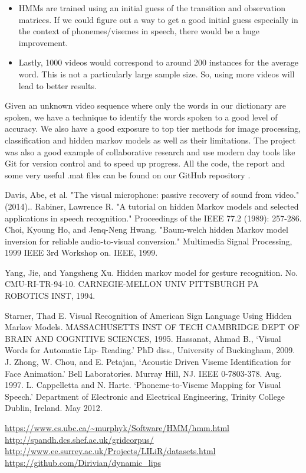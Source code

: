 \documentclass[a4paper]{article}
\begin{document}
\begin{itemize}
	\item HMMs are trained using an initial guess of the transition and observation matrices. If we could figure out a way to get a good initial guess especially in the context of phonemes/visemes in speech, there would be a huge improvement.
	
	\item Lastly, 1000 videos would correspond to around 200 instances for the average word. This is not a particularly large sample size. So, using more videos will lead to better results.		
\end{itemize}


Given an unknown video sequence where only the words in our dictionary are spoken, we have a technique to identify the words spoken to a good level of accuracy. We also have a good exposure to top tier methods for image processing, classification and hidden markov models as well as their limitations. The project was also a good example of collaborative research and use modern day tools like Git for version control and to speed up progress. All the code, the report and some very useful .mat files can be found on our GitHub repository \cite{key-12}.

\newpage
\begin{thebibliography}{1}
	Davis, Abe, et al. "The visual microphone: passive recovery of sound from video." (2014)..
	Rabiner, Lawrence R. "A tutorial on hidden Markov models and selected applications in speech recognition." Proceedings of the IEEE 77.2 (1989): 257-286.	
	Choi, Kyoung Ho, and Jenq-Neng Hwang. "Baum-welch hidden Markov model inversion for reliable audio-to-visual conversion." Multimedia Signal Processing, 1999 IEEE 3rd Workshop on. IEEE, 1999.
	
	Yang, Jie, and Yangsheng Xu. Hidden markov model for gesture recognition. No. CMU-RI-TR-94-10. CARNEGIE-MELLON UNIV PITTSBURGH PA ROBOTICS INST, 1994.

	Starner, Thad E. Visual Recognition of American Sign Language Using Hidden Markov Models. MASSACHUSETTS INST OF TECH CAMBRIDGE DEPT OF BRAIN AND COGNITIVE SCIENCES, 1995.
	Hassanat, Ahmad B., `Visual Words for Automatic Lip- Reading.' PhD diss., University of Buckingham, 2009.
	J. Zhong, W. Chou, and E. Petajan, `Acoustic Driven Viseme Identification for Face Animation.' Bell Laboratories. Murray Hill, NJ. IEEE 0-7803-378. Aug. 1997.
	L. Cappelletta and N. Harte. `Phoneme-to-Viseme Mapping for Visual Speech.' Department of Electronic and Electrical Engineering, Trinity College Dublin, Ireland. May 2012.
	
	\url{https://www.cs.ubc.ca/~murphyk/Software/HMM/hmm.html}
	\url{http://spandh.dcs.shef.ac.uk/gridcorpus/}
	\url{http://www.ee.surrey.ac.uk/Projects/LILiR/datasets.html}
	\url{https://github.com/Dirivian/dynamic_lips}
\end{thebibliography}
\end{document}
